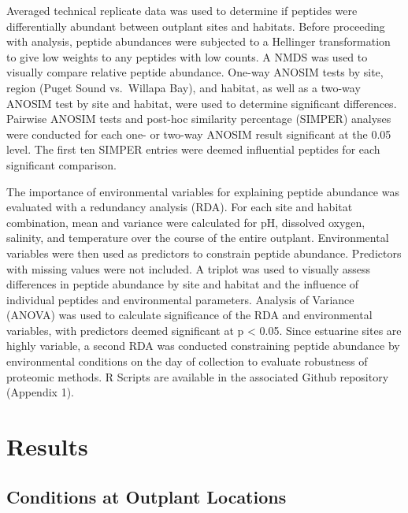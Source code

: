 \documentclass [11pt, proquest] {uwthesis}[2015/03/03]
\begin{document}
Averaged technical replicate data was used to determine if peptides were differentially abundant between outplant sites and habitats. Before proceeding with analysis, peptide abundances were subjected to a Hellinger transformation to give low weights to any peptides with low counts. A NMDS was used to visually compare relative peptide abundance. One-way ANOSIM tests by site, region (Puget Sound vs.~Willapa Bay), and habitat, as well as a two-way ANOSIM test by site and habitat, were used to determine significant differences. Pairwise ANOSIM tests and post-hoc similarity percentage (SIMPER) analyses were conducted for each one- or two-way ANOSIM result significant at the 0.05 level. The first ten SIMPER entries were deemed influential peptides for each significant comparison.

The importance of environmental variables for explaining peptide abundance was evaluated with a redundancy analysis (RDA). For each site and habitat combination, mean and variance were calculated for pH, dissolved oxygen, salinity, and temperature over the course of the entire outplant. Environmental variables were then used as predictors to constrain peptide abundance. Predictors with missing values were not included. A triplot was used to visually assess differences in peptide abundance by site and habitat and the influence of individual peptides and environmental parameters. Analysis of Variance (ANOVA) was used to calculate significance of the RDA and environmental variables, with predictors deemed significant at p \textless{} 0.05. Since estuarine sites are highly variable, a second RDA was conducted constraining peptide abundance by environmental conditions on the day of collection to evaluate robustness of proteomic methods. R Scripts are available in the associated Github repository (Appendix 1).

\hypertarget{results}{%
\section{Results}\label{results}}

\hypertarget{conditions-at-outplant-locations}{%
\subsection{Conditions at Outplant Locations}\label{conditions-at-outplant-locations}}
\end{document}
